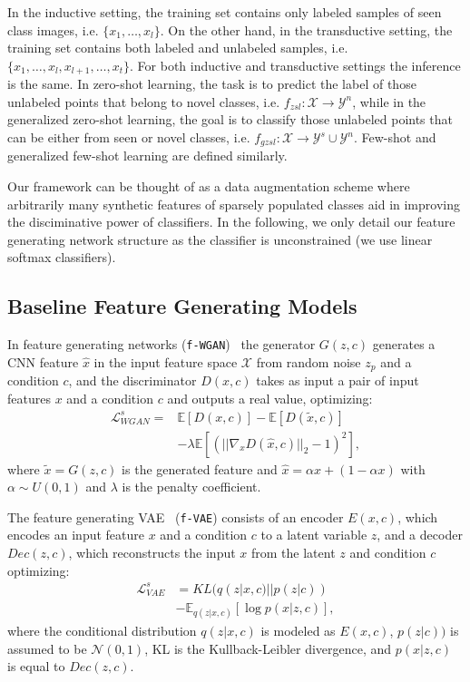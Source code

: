 \documentclass[10pt,twocolumn,letterpaper]{article}
\begin{document}
In the inductive setting, the training set contains only labeled samples of seen class images, i.e. $\{x_1,\ldots,x_l\}$. On the other hand, in the transductive setting, the training set contains both labeled and unlabeled samples, i.e. $\{x_1,\ldots,x_l,x_{l+1},\ldots,x_t \}$. For both inductive and transductive settings the inference is the same. In zero-shot learning, the task is to predict the label of those unlabeled points that belong to novel classes, i.e. $f_{zsl}: \mathcal{X} \rightarrow \mathcal{Y}^n$, while in the generalized zero-shot learning, the goal is to classify those unlabeled points that can be either from seen or novel classes, i.e. $f_{gzsl}: \mathcal{X} \rightarrow \mathcal{Y}^s \cup \mathcal{Y}^n$. Few-shot and generalized few-shot learning are defined similarly. 

Our framework can be thought of as a data augmentation scheme where arbitrarily many synthetic features of sparsely populated classes aid in improving the disciminative power of classifiers. In the following, we only detail our feature generating network structure as the classifier is unconstrained (we use linear softmax classifiers).    


\subsection{Baseline Feature Generating Models}
In feature generating networks (\texttt{f-WGAN})~\cite{XLSA18} the generator $G(z,c)$ generates a CNN feature $\hat{x}$ in the input feature space $\mathcal{X}$ from random noise $z_p$ and a condition $c$, and the discriminator $D(x,c)$ takes as input a pair of input features $x$ and a condition $c$ and outputs a real value, optimizing:
\begin{align}
\label{eq:wgan}
\mathcal{L}^s_{WGAN} =& \mathbb{E}[D(x,c)] - \mathbb{E}[D(\tilde{x},c)] \\ 
                   & - \lambda \mathbb{E}[\left(||\nabla_{\hat{x}} D(\hat{x},c)||_2 - 1\right)^2], \nonumber
\end{align}
where $\tilde{x}=G(z, c)$ is the generated feature and $\hat{x} = \alpha x +(1-\alpha x)$ with $\alpha \sim U(0,1)$ and $\lambda$ is the penalty coefficient. 

The feature generating VAE~\cite{kingma2013auto} (\texttt{f-VAE}) consists of an encoder $E(x,c)$, which encodes an input feature $x$ and a condition $c$ to a latent variable $z$, and a decoder $Dec(z,c)$, which reconstructs the input $x$ from the latent $z$ and condition $c$ optimizing:  
\begin{align}
\label{eq:kl}
\mathcal{L}^s_{VAE} & = KL(q(z|x, c)||p(z|c))  \\ 
& -\mathbb{E}_{q(z|x,c)}[\log p(x|z,c)], \nonumber
\end{align}
where the conditional distribution $q(z|x, c)$ is modeled as $E(x,c)$, $p(z|c))$ is assumed to be $\mathcal{N}(0,1)$, KL is the Kullback-Leibler divergence, and $p(x|z,c)$ is equal to $Dec(z,c)$. 
\end{document}

